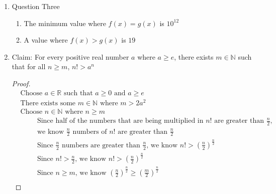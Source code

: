 \documentclass{article}
\begin{document}
\begin{enumerate}
\begin{enumerate}
\begin{proof}
\begin{eqnarray}
                &&\text{Since } n \text{ has one digit } n < 10 \\
                &&\text{Since } n<10 \text{ and the number of digits of } n=1, \text{ the sum of the digits is } n
            \end{eqnarray}
            (Inductive Step):
        \end{proof}
    \end{enumerate}
    \item Question Three
    \begin{enumerate}
        \item The minimum value where $f(x) = g(x)$ is $10^{12}$
        \item A value where $f(x) > g(x)$ is $19$
    \end{enumerate}
    \item Claim: For every positive real number $a$ where $a \geq e$, there exists $m \in \mathbb{N}$ such that for all $n \geq m$, $n! > a^n$
    \begin{proof}
        \begin{align}
            &\text{Choose } a \in \mathbb{R} \text{ such that } a \geq 0 \text{ and } a \geq e \\
            &\text{There exists some } m \in \mathbb{N} \text{ where } m > 2a^2 \\
            &\text{Choose } n \in \mathbb{N} \text{ where } n \geq m \\
            &\hspace{1cm} \text{Since half of the numbers that are being multiplied in } n! \text{ are greater than } \frac{n}{2} \text{,} \\
            &\hspace{1cm} \text{we know } \frac{n}{2} \text{ numbers of } n! \text{ are greater than } \frac{n}{2} \nonumber \\
            &\hspace{1cm} \text{Since } \frac{n}{2} \text{ numbers are greater than } \frac{n}{2} \text{, we know } n! > \left (\frac{n}{2}\right )^{\frac{n}{2}} \\
            &\hspace{1cm} \text{Since } n! > \frac{n}{2} \text{, we know } n! > \left (\frac{n}{2} \right )^{\frac{n}{2}} \\
            &\hspace{1cm} \text{Since } n \geq m \text{, we know } \left (\frac{n}{2}\right )^{\frac{n}{2}} \geq \left (\frac{m}{2}\right )^{\frac{n}{2}} \\

\end{align}
\end{proof}
\end{enumerate}
\end{document}
